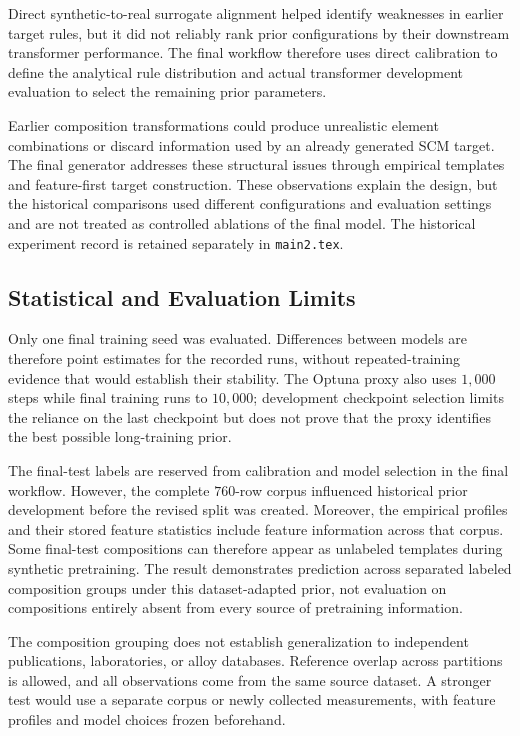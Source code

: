\documentclass{article}
\begin{document}
Direct synthetic-to-real surrogate alignment helped identify weaknesses in
earlier target rules, but it did not reliably rank prior configurations by
their downstream transformer performance. The final workflow therefore uses
direct calibration to define the analytical rule distribution and actual
transformer development evaluation to select the remaining prior parameters.

Earlier composition transformations could produce unrealistic element
combinations or discard information used by an already generated SCM target.
The final generator addresses these structural issues through empirical
templates and feature-first target construction. These observations explain
the design, but the historical comparisons used different configurations and
evaluation settings and are not treated as controlled ablations of the final
model. The historical experiment record is retained separately in
\texttt{main2.tex}.

\subsection{Statistical and Evaluation Limits}

Only one final training seed was evaluated. Differences between models are
therefore point estimates for the recorded runs, without repeated-training
evidence that would establish their stability. The Optuna proxy also uses
\(1{,}000\) steps while final training runs to \(10{,}000\); development
checkpoint selection limits the reliance on the last checkpoint but does not
prove that the proxy identifies the best possible long-training prior.

The final-test labels are reserved from calibration and model selection in
the final workflow. However, the complete \(760\)-row corpus influenced
historical prior development before the revised split was created. Moreover,
the empirical profiles and their stored feature statistics include feature
information across that corpus. Some final-test compositions can therefore
appear as unlabeled templates during synthetic pretraining. The result
demonstrates prediction across separated labeled composition groups under
this dataset-adapted prior, not evaluation on compositions entirely absent
from every source of pretraining information.

The composition grouping does not establish generalization to independent
publications, laboratories, or alloy databases. Reference overlap across
partitions is allowed, and all observations come from the same source
dataset. A stronger test would use a separate corpus or newly collected
measurements, with feature profiles and model choices frozen beforehand.
\end{document}

